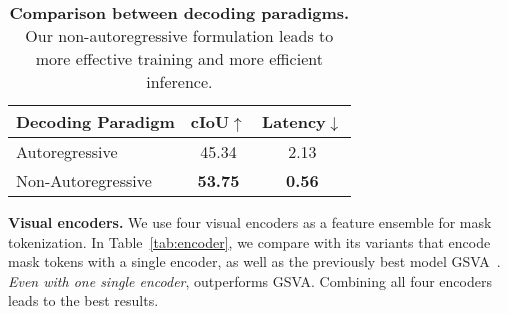 \begin{table}[ht]
    \centering
    \begin{tabular}{l c c}
        \toprule
        Decoding Paradigm & cIoU$\uparrow$ & Latency$\downarrow$ \\
        \midrule
        Autoregressive & 45.34 & 2.13 \\
        \cellcolor{cellgray}Non-Autoregressive & \cellcolor{cellgray}\bf 53.75 & \cellcolor{cellgray}\bf 0.56 \\
        \bottomrule
    \end{tabular}
    \caption{\textbf{Comparison between decoding paradigms.} Our non-autoregressive formulation leads to more effective training and more efficient inference.}
    \label{tab:ar}
    \vspace{-2mm}
\end{table}

\noindent\textbf{Visual encoders.} We use four visual encoders as a feature ensemble for mask tokenization. In Table~\ref{tab:encoder}, we compare \ourmodel with its variants that encode mask tokens with a single encoder, as well as the previously best model GSVA~\cite{xia2024gsva}. \emph{Even with one single encoder}, \ourmodel outperforms GSVA. Combining all four encoders leads to the best results.

{
\setlength{\tabcolsep}{2pt}
\begin{table}[ht]
    \centering
    \vspace{-2mm}
    \caption{\textbf{Comparison of \ourmodel with different visual encoders.} Our ensemble of four visual encoders yields the best visual features for mask tokenization.}
    \label{tab:encoder}
    \vspace{-2mm}
\end{table}
}

